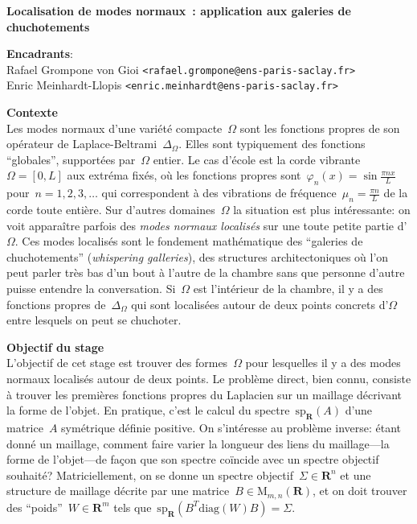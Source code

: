\documentclass[a4paper,11pt]{article}
\begin{document}
\thispagestyle{empty}

{\bf
	Localisation de modes normaux~:
	application aux galeries de chuchotements
}

{\bf Encadrants}:\\
Rafael Grompone von Gioi \verb+<rafael.grompone@ens-paris-saclay.fr>+\\
Enric Meinhardt-Llopis \verb+<enric.meinhardt@ens-paris-saclay.fr>+ 

{\bf Contexte}\\
Les modes normaux d'une variété compacte~$\Omega$ sont les fonctions propres de
son opérateur de Laplace-Beltrami~$\Delta_\Omega$.  Elles sont typiquement des
fonctions ``globales'', supportées par~$\Omega$ entier.  Le cas d'école est la
corde vibrante~$\Omega=[0,L]$ aux extréma fixés, où les
fonctions propres sont~$\varphi_n(x)=\sin\frac{\pi n x}L$
pour~$n=1,2,3,\ldots$ qui correspondent à des vibrations
de fréquence~$\mu_n=\frac{\pi n}L$ de la corde toute entière.  Sur d'autres
domaines~$\Omega$ la situation est plus intéressante: on voit apparaître
parfois des \emph{modes normaux localisés} sur une toute petite partie
d'$\Omega$.
Ces modes localisés sont le fondement mathématique des ``galeries de
chuchotements'' (\emph{whispering galleries}), des structures architectoniques
où l'on peut parler très bas d'un bout à l'autre de la chambre sans que
personne d'autre puisse entendre la conversation.  Si~$\Omega$ est l'intérieur
de la chambre, il y a des fonctions propres de~$\Delta_\Omega$ qui sont
localisées autour de deux points concrets d'$\Omega$ entre lesquels on peut se
chuchoter.


{\bf Objectif du stage}\\
L'objectif de cet stage est trouver des formes~$\Omega$ pour lesquelles il y a
des modes normaux localisés autour de deux points.
Le problème direct, bien connu, consiste à trouver
les premières fonctions propres du Laplacien sur un maillage décrivant la forme
de l'objet.  En pratique, c'est le calcul du
spectre~$\mathrm{sp}_{\mathbf{R}}(A)$ d'une matrice~$A$ symétrique définie
positive.
On s'intéresse au problème inverse: étant donné un maillage, comment faire
varier la longueur des liens du maillage---la forme de l'objet---de façon que
son spectre coïncide avec un spectre objectif souhaité?
Matriciellement, on se donne un spectre
objectif~$\Sigma\in\mathbf{R}^n$ et une structure de maillage décrite par une
matrice~$B\in\mathrm{M}_{m,n}(\mathbf{R})$, et on doit trouver des
``poids''~$W\in\mathbf{R}^m$ tels
que~$\mathrm{sp}_\mathbf{R}\left(B^T\mathrm{diag}(W)B\right)=\Sigma$.
\end{document}
